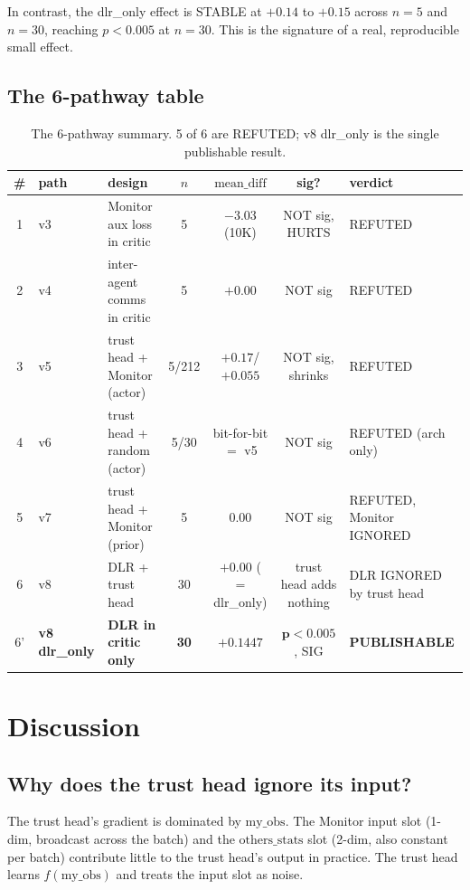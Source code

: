 \documentclass[11pt]{article}
\begin{document}
In contrast, the dlr\_only effect is STABLE at $+0.14$ to $+0.15$
across $n=5$ and $n=30$, reaching $p<0.005$ at $n=30$. This is the
signature of a real, reproducible small effect.

\subsection{The 6-pathway table}

\begin{table}[h]
\centering
\small
\begin{tabular}{cllcccl}
\toprule
\# & path & design & $n$ & $\text{mean\_diff}$ & sig? & verdict \\
\midrule
1 & v3 & Monitor aux loss in critic & 5 & $-3.03$ (10K) & NOT sig, HURTS & REFUTED \\
2 & v4 & inter-agent comms in critic & 5 & $+0.00$ & NOT sig & REFUTED \\
3 & v5 & trust head + Monitor (actor) & 5/212 & $+0.17$/$+0.055$ & NOT sig, shrinks & REFUTED \\
4 & v6 & trust head + random (actor) & 5/30 & bit-for-bit $=$ v5 & NOT sig & REFUTED (arch only) \\
5 & v7 & trust head + Monitor (prior) & 5 & $0.00$ & NOT sig & REFUTED, Monitor IGNORED \\
6 & v8 & DLR + trust head & 30 & $+0.00$ ($=$ dlr\_only) & trust head adds nothing & DLR IGNORED by trust head \\
6' & \textbf{v8 dlr\_only} & \textbf{DLR in critic only} & \textbf{30} & $\mathbf{+0.1447}$ & $\mathbf{p<0.005}$, SIG & \textbf{PUBLISHABLE} \\
\bottomrule
\end{tabular}
\caption{The 6-pathway summary. 5 of 6 are REFUTED; v8 dlr\_only is
the single publishable result.}
\end{table}

\section{Discussion}

\subsection{Why does the trust head ignore its input?}

The trust head's gradient is dominated by $\text{my\_obs}$. The
Monitor input slot (1-dim, broadcast across the batch) and the
$\text{others\_stats}$ slot (2-dim, also constant per batch)
contribute little to the trust head's output in practice. The
trust head learns $f(\text{my\_obs})$ and treats the input slot as
noise.
\end{document}
